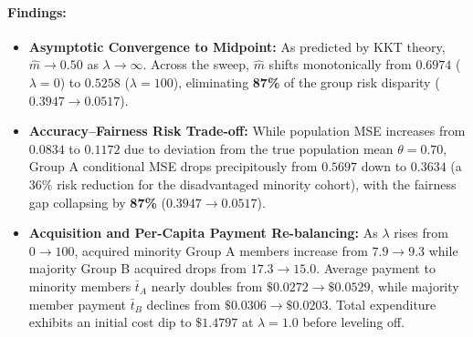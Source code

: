 \documentclass[11pt,a4paper]{article}
\begin{document}
\paragraph{Findings:}
\begin{itemize}[leftmargin=1.5em, itemsep=2pt, parsep=0pt, topsep=2pt]
    \item \textbf{Asymptotic Convergence to Midpoint:} As predicted by KKT theory, $\widehat{m} \to 0.50$ as $\lambda \to \infty$. Across the sweep, $\widehat{m}$ shifts monotonically from $0.6974$ ($\lambda = 0$) to $\mathbf{0.5258}$ ($\lambda = 100$), eliminating \textbf{87\%} of the group risk disparity ($0.3947 \to 0.0517$).
    \item \textbf{Accuracy--Fairness Risk Trade-off:} While population MSE increases from $0.0834$ to $0.1172$ due to deviation from the true population mean $\theta = 0.70$, Group A conditional MSE drops precipitously from $0.5697$ down to $0.3634$ (a $36\%$ risk reduction for the disadvantaged minority cohort), with the fairness gap collapsing by \textbf{87\%} ($0.3947 \to 0.0517$).
    \item \textbf{Acquisition and Per-Capita Payment Re-balancing:} As $\lambda$ rises from $0 \to 100$, acquired minority Group A members increase from $7.9 \to 9.3$ while majority Group B acquired drops from $17.3 \to 15.0$. Average payment to minority members $\bar{t}_A$ nearly doubles from $\$0.0272 \to \mathbf{\$0.0529}$, while majority member payment $\bar{t}_B$ declines from $\$0.0306 \to \$0.0203$. Total expenditure exhibits an initial cost dip to $\$1.4797$ at $\lambda = 1.0$ before leveling off.
\end{itemize}
\end{document}
